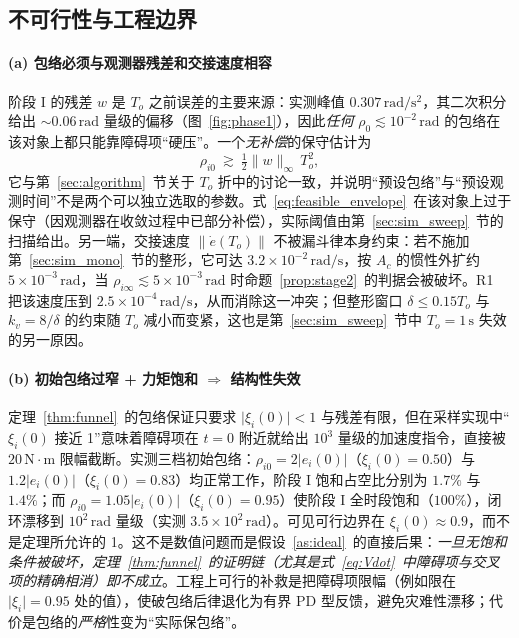 \subsection{不可行性与工程边界}
\label{sec:sim_infeasible}

\paragraph{(a) 包络必须与观测器残差和交接速度相容}
阶段 I 的残差 \(w\) 是 \(T_o\) 之前误差的主要来源：实测峰值 \(0.307\,\mathrm{rad/s^2}\)，其二次积分给出 \(\sim0.06\,\mathrm{rad}\) 量级的偏移（图~\ref{fig:phase1}），因此\emph{任何} \(\rho_0\lesssim10^{-2}\,\mathrm{rad}\) 的包络在该对象上都只能靠障碍项“硬压”。一个\emph{无补偿}的保守估计为
\begin{equation}
\rho_{i0}\ \gtrsim\ \tfrac12\lVert w\rVert_\infty\,T_o^{2},
\label{eq:feasible_envelope}
\end{equation}
它与第~\ref{sec:algorithm}~节关于 \(T_o\) 折中的讨论一致，并说明“预设包络”与“预设观测时间”不是两个可以独立选取的参数。式~\eqref{eq:feasible_envelope}~在该对象上过于保守（因观测器在收敛过程中已部分补偿），实际阈值由第~\ref{sec:sim_sweep}~节的扫描给出。另一端，交接速度 \(\lVert\dot e(T_o)\rVert\) 不被漏斗律本身约束：若不施加第~\ref{sec:sim_mono}~节的整形，它可达 \(3.2\times10^{-2}\,\mathrm{rad/s}\)，按 \(A_c\) 的惯性外扩约 \(5\times10^{-3}\,\mathrm{rad}\)，当 \(\rho_{i\infty}\lesssim5\times10^{-3}\,\mathrm{rad}\) 时命题~\ref{prop:stage2}~的判据会被破坏。R1 把该速度压到 \(2.5\times10^{-4}\,\mathrm{rad/s}\)，从而消除这一冲突；但整形窗口 \(\delta\le0.15T_o\) 与 \(k_v=8/\delta\) 的约束随 \(T_o\) 减小而变紧，这也是第~\ref{sec:sim_sweep}~节中 \(T_o=1\,\mathrm{s}\) 失效的另一原因。

\paragraph{(b) 初始包络过窄 + 力矩饱和 \texorpdfstring{$\Rightarrow$}{=>} 结构性失效}
定理~\ref{thm:funnel}~的包络保证只要求 \(\lvert\xi_i(0)\rvert<1\) 与残差有限，但在采样实现中“\(\xi_i(0)\) 接近 1”意味着障碍项在 \(t=0\) 附近就给出 \(10^{3}\) 量级的加速度指令，直接被 \(20\,\mathrm{N\cdot m}\) 限幅截断。实测三档初始包络：\(\rho_{i0}=2\lvert e_i(0)\rvert\)（\(\xi_i(0)=0.50\)）与 \(1.2\lvert e_i(0)\rvert\)（\(\xi_i(0)=0.83\)）均正常工作，阶段 I 饱和占空比分别为 \(1.7\%\) 与 \(1.4\%\)；而 \(\rho_{i0}=1.05\lvert e_i(0)\rvert\)（\(\xi_i(0)=0.95\)）使阶段 I 全时段饱和（\(100\%\)），闭环漂移到 \(10^{2}\,\mathrm{rad}\) 量级（实测 \(3.5\times10^{2}\,\mathrm{rad}\)）。可见可行边界在 \(\xi_i(0)\approx0.9\)，而不是定理所允许的 1。这不是数值问题而是假设~\ref{as:ideal}~的直接后果：\emph{一旦无饱和条件被破坏，定理~\ref{thm:funnel}~的证明链（尤其是式~\eqref{eq:Vdot}~中障碍项与交叉项的精确相消）即不成立}。工程上可行的补救是把障碍项限幅（例如限在 \(\lvert\xi_i\rvert=0.95\) 处的值），使破包络后律退化为有界 PD 型反馈，避免灾难性漂移；代价是包络的\emph{严格}性变为“实际保包络”。

